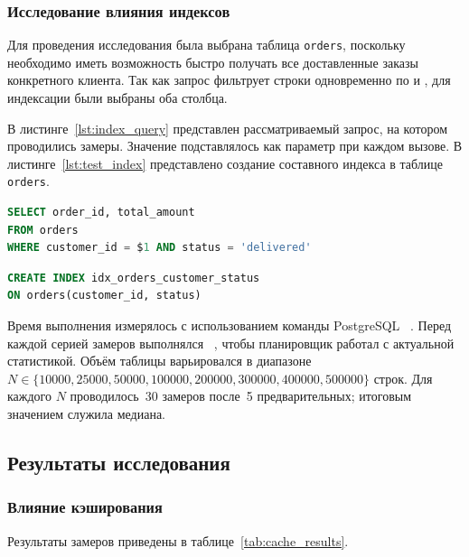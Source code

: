 \subsubsection{Исследование влияния индексов}

Для проведения исследования была выбрана таблица \texttt{orders}, поскольку необходимо иметь возможность быстро получать все доставленные заказы конкретного клиента. Так как запрос фильтрует строки одновременно по  и , для индексации были выбраны оба столбца.

В листинге~\ref{lst:index_query} представлен рассматриваемый запрос, на котором проводились замеры. Значение  подставлялось как параметр при каждом вызове. В листинге~\ref{lst:test_index} представлено создание составного индекса в таблице \texttt{orders}.

\begin{lstlisting}[language=SQL, caption={Рассматриваемый запрос}, label={lst:index_query}]
SELECT order_id, total_amount
FROM orders
WHERE customer_id = $1 AND status = 'delivered'
\end{lstlisting}

\begin{lstlisting}[language=SQL, caption={Создание составного индекса}, label={lst:test_index}]
CREATE INDEX idx_orders_customer_status
ON orders(customer_id, status)
\end{lstlisting}

Время выполнения измерялось с использованием команды PostgreSQL ~\cite{explain}. Перед каждой серией замеров выполнялся ~\cite{vacuum}, чтобы планировщик работал с актуальной статистикой. Объём таблицы варьировался в диапазоне $N \in \{10000, \allowbreak{} 25000, \allowbreak{} 50000, \allowbreak{} 100000,\allowbreak{} 200000, \allowbreak{} 300000, \allowbreak{} 400000, \allowbreak{} 500000\}$ строк. Для каждого $N$ проводилось~30 замеров после~5 предварительных; итоговым значением служила медиана.


\subsection{Результаты исследования}

\subsubsection{Влияние кэширования}

Результаты замеров приведены в таблице~\ref{tab:cache_results}.

